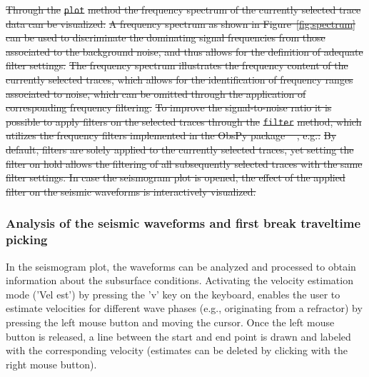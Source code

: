 \documentclass[a4paper,fleqn]{cas-sc}
\providecommand{\DIFdel}[1]{{\protect\color{red}\sout{#1}}}                      %
\providecommand{\DIFdelbegin}{} %
\providecommand{\DIFdelend}{} %
\providecommand{\DIFdelFL}[1]{\DIFdel{#1}} %
\newcommand{\DIFscaledelfig}{0.5}
\newlength{\DIFdelgraphicswidth} %
\newlength{\DIFdelgraphicsheight} %
\newcommand{\DIFdelincludegraphics}[2][]{%
\sbox{\DIFdelgraphicsbox}{\DIFOincludegraphics[#1]{#2}}%
\settoboxwidth{\DIFdelgraphicswidth}{\DIFdelgraphicsbox} %
\settoboxtotalheight{\DIFdelgraphicsheight}{\DIFdelgraphicsbox} %
\scalebox{\DIFscaledelfig}{%
\parbox[b]{\DIFdelgraphicswidth}{\usebox{\DIFdelgraphicsbox}\\[-\baselineskip] \rule{\DIFdelgraphicswidth}{0em}}\llap{\resizebox{\DIFdelgraphicswidth}{\DIFdelgraphicsheight}{%
\setlength{\unitlength}{\DIFdelgraphicswidth}%
\begin{picture}(1,1)%
\thicklines\linethickness{2pt} %
{\color[rgb]{1,0,0}\put(0,0){\framebox(1,1){}}}%
{\color[rgb]{1,0,0}\put(0,0){\line( 1,1){1}}}%
{\color[rgb]{1,0,0}\put(0,1){\line(1,-1){1}}}%
\end{picture}%
}\hspace*{3pt}}} %
} %
\DeclareRobustCommand{\DIFdelbegin}{\DIFOdelbegin \let\includegraphics\DIFdelincludegraphics} %
\DeclareRobustCommand{\DIFdelend}{\DIFOaddend \let\includegraphics\DIFOincludegraphics} %
\begin{document}
\DIFdelbegin \DIFdel{Through the }\texttt{\DIFdel{plot}} %
\DIFdel{method the frequency spectrum of the currently selected trace data can be visualized:
}%
\DIFdel{A frequency spectrum as shown in Figure~\ref{fig:spectrum} can be used to discriminate the dominating signal frequencies from those associated to the background noise, and thus allows for the definition of adequate filter settings.
}%
{%
\DIFdelFL{The frequency spectrum illustrates the frequency content of the currently selected traces, which allows for the identification of frequency ranges associated to noise, which can be omitted through the application of corresponding frequency filtering.}}
\DIFdel{To improve the signal-to-noise ratio it is possible to apply filters on the selected traces through the }\texttt{\DIFdel{filter}} %
\DIFdel{method, which utilizes the frequency filters implemented in the ObsPy package \mbox{%
\citep[lowpass, highpass, bandpass and bandstop;][]{beyreuther2010}}\hskip0pt%
, e.g.:
}%
\DIFdel{By default, filters are solely applied to the currently selected traces, yet setting the filter on hold allows the filtering of all subsequently selected traces with the same filter settings.
In case the seismogram plot is opened, the effect of the applied filter on the seismic waveforms is interactively visualized.
}%

\DIFdelend \subsubsection{Analysis of the seismic waveforms and first break traveltime picking}

In the seismogram plot, the waveforms can be analyzed and processed to obtain information about the subsurface conditions. Activating the velocity estimation mode ('Vel est') by pressing the 'v' key on the keyboard, enables the user to estimate velocities for different wave phases (e.g., originating from a refractor) by pressing the left mouse button and moving the cursor. Once the left mouse button is released, a line between the start and end point is drawn and labeled with the corresponding velocity (estimates can be deleted by clicking with the right mouse button).
\end{document}
